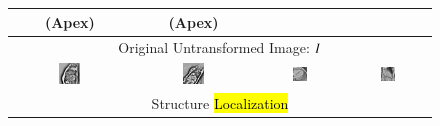 \renewcommand{\captiontitle}{Selected failure cases from \CNN{} segmentation}
\begin{figure}
\begin{center}

\setlength{\tabcolsep}{1pt}

\begin{tabular}{cccc}

\toprule
\SA{} (Apex) & \SA{} (Apex) & \HLA{} & \VLA{} \\
\midrule

\multicolumn{4}{c}{Original Untransformed Image: $I$} \\

\includegraphics[width=0.19\textwidth]{./data/failures/HCMNet_2000062/00_SAX/9/9.png} &
\includegraphics[width=0.19\textwidth]{./data/failures/HCMNet_2400044/00_SAX/2/5.png} &
\includegraphics[width=0.19\textwidth]{./data/failures/HCMNet_2600079/01_HLA/00/0.png} &
\includegraphics[width=0.19\textwidth]{./data/failures/HCMNet_2600079/02_VLA/00/0.png} \\

\multicolumn{4}{c}{Structure \hl{Localization}} \\


\end{tabular}
\end{center}
\end{figure}
